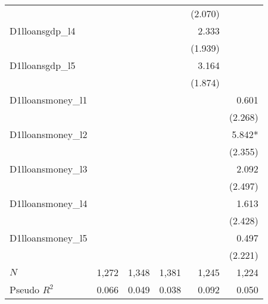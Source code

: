 \begin{tabular}{lrrrrr}
                  &           &           &           &   (2.070) &           \\ 
D1lloansgdp\_l4   &           &           &           &     2.333 &           \\ 
                  &           &           &           &   (1.939) &           \\ 
D1lloansgdp\_l5   &           &           &           &     3.164 &           \\ 
                  &           &           &           &   (1.874) &           \\ 
D1lloansmoney\_l1 &           &           &           &           &     0.601 \\ 
                  &           &           &           &           &   (2.268) \\ 
D1lloansmoney\_l2 &           &           &           &           &    5.842* \\ 
                  &           &           &           &           &   (2.355) \\ 
D1lloansmoney\_l3 &           &           &           &           &     2.092 \\ 
                  &           &           &           &           &   (2.497) \\ 
D1lloansmoney\_l4 &           &           &           &           &     1.613 \\ 
                  &           &           &           &           &   (2.428) \\ 
D1lloansmoney\_l5 &           &           &           &           &     0.497 \\ 
                  &           &           &           &           &   (2.221) \\ 
\midrule
$N$               &     1,272 &     1,348 &     1,381 &     1,245 &     1,224 \\ 
Pseudo $R^2$      &     0.066 &     0.049 &     0.038 &     0.092 &     0.050 \\ 
\bottomrule
\end{tabular}
